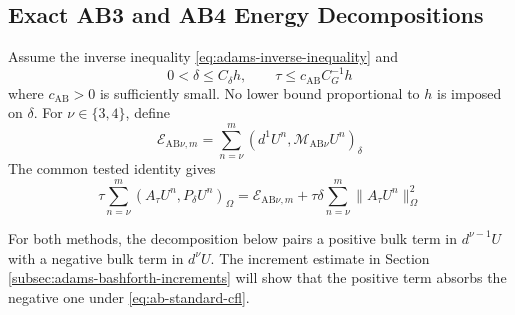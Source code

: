 \documentclass[11pt]{article}
\begin{document}

\subsection{Exact AB3 and AB4 Energy Decompositions}
\label{subsec:adams-bashforth-energy}
Assume the inverse inequality \eqref{eq:adams-inverse-inequality} and
\begin{equation}
0<\delta\le C_{\delta}h,\qquad
\tau\le c_{\mathrm{AB}}C_G^{-1}h \label{eq:ab-standard-cfl}
\end{equation}
where \(c_{\mathrm{AB}}>0\) is sufficiently small. No lower bound proportional
to \(h\) is imposed on \(\delta\). For \(\nu\in\{3,4\}\), define
\begin{equation}
\mathcal E_{\mathrm{AB}\nu,m}
=\sum_{n=\nu}^m(d^1U^n,\mathcal M_{\mathrm{AB}\nu}U^n)_{\delta}
\label{eq:ab-discrete-energy}
\end{equation}
The common tested identity gives
\begin{equation}
\tau\sum_{n=\nu}^m(A_{\tau}U^n,P_{\delta}U^n)_{\Omega}
=\mathcal E_{\mathrm{AB}\nu,m}
+\tau\delta\sum_{n=\nu}^m\|A_{\tau}U^n\|_{\Omega}^2
\label{eq:ab-tested-energy-identity}
\end{equation}

For both methods, the decomposition below pairs a positive bulk term in
\(d^{\nu-1}U\) with a negative bulk term in \(d^{\nu}U\).
The increment estimate in Section \ref{subsec:adams-bashforth-increments}
will show that the positive term absorbs the negative one under
\eqref{eq:ab-standard-cfl}.
\end{document}
